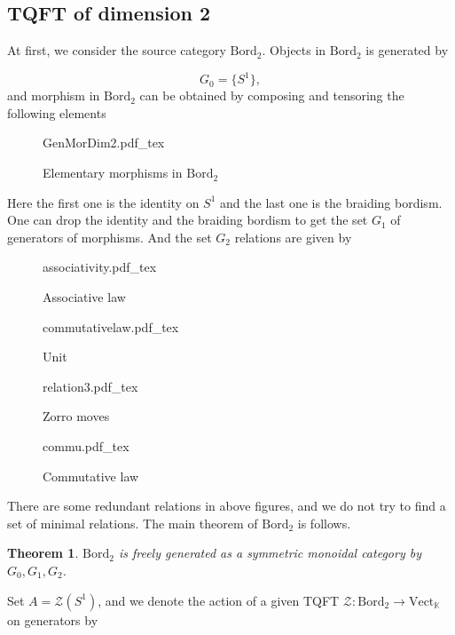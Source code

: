 \documentclass[10pt,reqno,final]{article}
\newcommand{\incfig}[1]{%
    \def\svgscale{0.38}
    {#1.pdf_tex}
}
\numberwithin{equation}{section}
\numberwithin{figure}{section}
\numberwithin{table}{section}
\theoremstyle{plain}
\newtheorem{theorem}{Theorem}[section]
\theoremstyle{definition}
\theoremstyle{remark}
\begin{document}
    \subsection{TQFT of dimension 2}

    At first, we consider the source category \(\mathrm{Bord}_{2}\). Objects in \(\mathrm{Bord}_{2}\) is generated by 
    
    
    \begin{equation}
      G_{0}=\{ S^{1} \},
    \end{equation}
    and morphism in \(\mathrm{Bord}_{2}\) can be obtained by composing and tensoring the following elements
\begin{figure}[H]
  \centering
  \incfig{GenMorDim2}
  \caption{Elementary morphisms in \(\mathrm{Bord}_{2}\)}
  \label{fig:GenMorDim2}
\end{figure}
    Here the first one is the identity on \(S^{1}\) and the last one is the braiding bordism. One can drop the identity and the braiding bordism to get the set \(G_{1}\) of generators of morphisms. And the set \(G_{2}\) relations are given by 
\begin{figure}[H]
  \centering
  \incfig{associativity}
  \caption{Associative law}
  \label{fig:associativity}
\end{figure}
\begin{figure}[H]
  \centering
  \incfig{commutativelaw}
  \caption{Unit}
  \label{fig:R2}
\end{figure}
\begin{figure}[H]
  \centering
  \incfig{relation3}
  \caption{Zorro moves}
  \label{fig:relation3}
\end{figure}
\begin{figure}[H]
  \centering
  \incfig{commu}
  \caption{Commutative law}
  \label{fig:commu}
\end{figure}
    There are some redundant relations in above figures, and we do not try to find a set of minimal relations. The main theorem of \(\mathrm{Bord}_{2}\) is follows.
    \begin{theorem}
      \(\mathrm{Bord}_{2}\) is freely generated as a symmetric monoidal category by \(G_{0},G_1,G_2\).
    \end{theorem}
    Set \(A=\mathcal{Z}(S^{1})\), and we denote the action of a given TQFT \(\mathcal{Z}:\mathrm{Bord}_{2}\to \mathrm{Vect}_{\mathbb{K}}\) on generators by 
\end{document}

